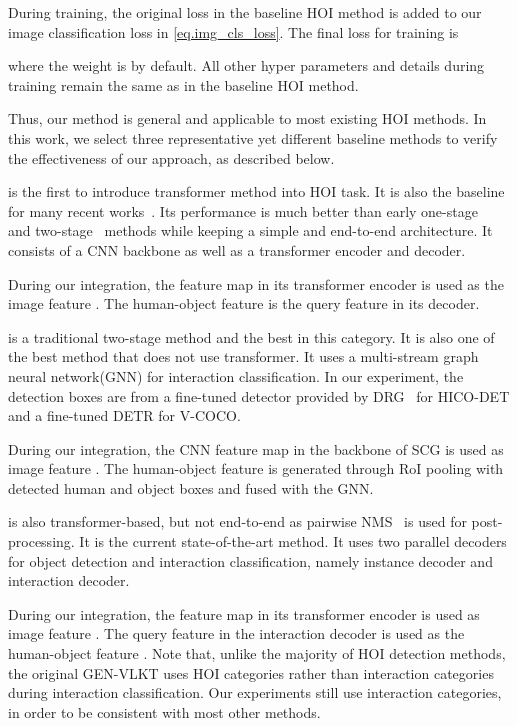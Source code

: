 \documentclass[10pt,twocolumn,letterpaper]{article}
\begin{document}
During training, the original loss in the baseline HOI method  is added to our image classification loss in \cref{eq.img_cls_loss}. The final loss  for training is


where the weight  is  by default. All other hyper parameters and details during training remain the same as in the baseline HOI method.

Thus, our method is general and applicable to most existing HOI methods. In this work, we select three representative yet different baseline methods to verify the effectiveness of our approach, as described below.

 is the first to introduce transformer method into HOI task. It is also the baseline for many recent works~\cite{zhang2021mining, zhou2022disentangled, park2022consistency, iftekhar2022ssrt, zhong2022hardquerymining}. Its performance is much better than early one-stage~\cite{liao2020ppdm, kim2020uniondet, wang2020learning} and two-stage~\cite{gupta2019nofrills, gao2020drg, kim2020detecting} methods while keeping a simple and end-to-end architecture. It consists of a CNN backbone as well as a transformer encoder and decoder.

During our integration, the feature map in its transformer encoder is used as the image feature . The human-object feature  is the query feature in its decoder.

 is a traditional two-stage method and the best in this category. It is also one of the best method that does not use transformer. It uses a multi-stream graph neural network(GNN) for interaction classification. In our experiment, the detection boxes are from a fine-tuned detector provided by DRG~\cite{gao2020drg} for HICO-DET and a fine-tuned DETR for V-COCO.

During our integration, the CNN feature map in the backbone of SCG is used as image feature . The human-object feature  is generated through RoI pooling with detected human and object boxes and fused with the GNN.

 is also transformer-based, but not end-to-end as pairwise NMS~\cite{zhang2021mining} is used for post-processing.
It is the current state-of-the-art method. It uses two parallel decoders for object detection and interaction classification, namely instance decoder and interaction decoder.


During our integration, the feature map in its transformer encoder is used as image feature . The query feature in the interaction decoder is used as the human-object feature . Note that, unlike the majority of HOI detection methods, the original GEN-VLKT uses HOI categories rather than interaction categories during interaction classification. Our experiments still use interaction categories, in order to be consistent with most other methods.
\end{document}
